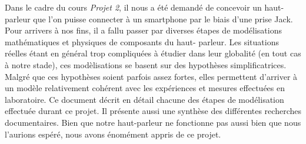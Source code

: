 

\begin{abstract-fr}
Dans le cadre du cours \textit{Projet 2}, il nous a été demandé
de concevoir un haut-parleur que l'on puisse connecter à un smartphone
par le biais d'une prise Jack.
Pour arrivers à nos fins, il a fallu passer par diverses étapes
de modélisations mathématiques et physiques de composants du haut-
parleur. Les situations réelles étant en général trop compliquées à étudier
dans leur globalité (en tout cas à notre stade), ces modèlisations se basent sur des hypothèses simplificatrices. Malgré que ces hypothèses soient parfois assez fortes, 
elles permettent d'arriver à un modèle relativement cohérent avec les expériences et
mesures effectuées en laboratoire.
Ce document décrit en détail chacune des étapes de modélisation effectuée durant
ce projet. Il présente aussi une synthèse des différentes recherches documentaires.
Bien que notre haut-parleur ne fonctionne pas aussi bien que nous l'aurions
espéré, nous avons énomément appris de ce projet.

\end{abstract-fr}



